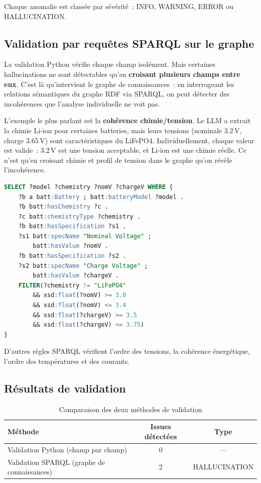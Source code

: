 \documentclass[12pt,a4paper]{article}
\begin{document}
Chaque anomalie est class\'ee par s\'ev\'erit\'e~: INFO, WARNING, ERROR ou HALLUCINATION.

\subsection{Validation par requ\^etes SPARQL sur le graphe}

La validation Python v\'erifie chaque champ isol\'ement. Mais certaines hallucinations ne sont d\'etectables qu'en \textbf{croisant plusieurs champs entre eux}. C'est l\`a qu'intervient le graphe de connaissances~: en interrogeant les relations s\'emantiques du graphe RDF via SPARQL, on peut d\'etecter des incoh\'erences que l'analyse individuelle ne voit pas.

L'exemple le plus parlant est la \textbf{coh\'erence chimie/tension}. Le LLM a extrait la chimie \og Li-ion \fg{} pour certaines batteries, mais leurs tensions (nominale 3.2\,V, charge 3.65\,V) sont caract\'eristiques du LiFePO4. Individuellement, chaque valeur est valide~: 3.2\,V est une tension acceptable, et \og Li-ion \fg{} est une chimie r\'eelle. Ce n'est qu'en croisant chimie et profil de tension dans le graphe qu'on r\'ev\`ele l'incoh\'erence.

\begin{lstlisting}[language=SQL, caption={D\'etection d'hallucination chimie/tension via SPARQL}]
SELECT ?model ?chemistry ?nomV ?chargeV WHERE {
    ?b a batt:Battery ; batt:batteryModel ?model .
    ?b batt:hasChemistry ?c .
    ?c batt:chemistryType ?chemistry .
    ?b batt:hasSpecification ?s1 .
    ?s1 batt:specName "Nominal Voltage" ;
        batt:hasValue ?nomV .
    ?b batt:hasSpecification ?s2 .
    ?s2 batt:specName "Charge Voltage" ;
        batt:hasValue ?chargeV .
    FILTER(?chemistry != "LiFePO4"
        && xsd:float(?nomV) >= 3.0
        && xsd:float(?nomV) <= 3.4
        && xsd:float(?chargeV) >= 3.5
        && xsd:float(?chargeV) <= 3.75)
}
\end{lstlisting}

D'autres r\`egles SPARQL v\'erifient l'ordre des tensions, la coh\'erence \'energ\'etique, l'ordre des temp\'eratures et des courants.

\subsection{R\'esultats de validation}

\begin{table}[H]
\centering
\caption{Comparaison des deux m\'ethodes de validation}
\label{tab:validation}
\begin{tabular}{lcc}
\toprule
\textbf{M\'ethode} & \textbf{Issues d\'etect\'ees} & \textbf{Type} \\
\midrule
Validation Python (champ par champ) & 0 & --- \\
Validation SPARQL (graphe de connaissances) & 2 & HALLUCINATION \\
\bottomrule
\end{tabular}
\end{table}
\end{document}
